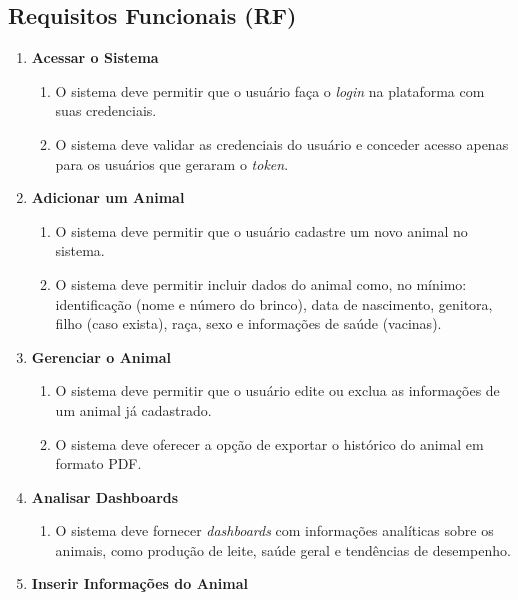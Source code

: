 \documentclass[12pt, a4paper]{article}
\begin{document}
\subsection{Requisitos Funcionais (RF)}
\begin{spacing}{1.5}
\begin{enumerate}[label=RF\arabic{*}.]
    \item \textbf{Acessar o Sistema}
    \begin{enumerate}[label=RF\arabic{*}.0\arabic{*}]
        \item O sistema deve permitir que o usuário faça o \textit{login} na plataforma com suas credenciais.
        \item O sistema deve validar as credenciais do usuário e conceder acesso apenas para os usuários que geraram o \textit{token}.
    \end{enumerate}
    \item \textbf{Adicionar um Animal}
    \begin{enumerate}[label=RF\arabic{*}.0\arabic{*}]
        \item O sistema deve permitir que o usuário cadastre um novo animal no sistema.
        \item O sistema deve permitir incluir dados do animal como, no mínimo: identificação (nome e número do brinco), data de nascimento, genitora, filho (caso exista), raça, sexo e informações de saúde (vacinas).
    \end{enumerate}
    \item \textbf{Gerenciar o Animal}
    \begin{enumerate}[label=RF\arabic{*}.0\arabic{*}]
        \item O sistema deve permitir que o usuário edite ou exclua as informações de um animal já cadastrado.
        \item O sistema deve oferecer a opção de exportar o histórico do animal em formato PDF.
    \end{enumerate}
    \item \textbf{Analisar Dashboards}
    \begin{enumerate}[label=RF05.0\arabic{*}]
        \item O sistema deve fornecer \textit{dashboards} com informações analíticas sobre os animais, como produção de leite, saúde geral e tendências de desempenho.
    \end{enumerate}
    \item \textbf{Inserir Informações do Animal}
    \begin{enumerate}[label=RF06.0\arabic{*}]

\end{enumerate}
\end{enumerate}
\end{spacing}
\end{document}
